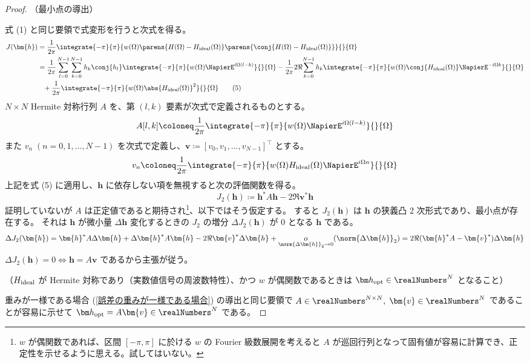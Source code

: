             \begin{proof}
                \quad\par\noindent
                （最小点の導出）
                \par
                式 (1) と同じ要領で式変形を行うと次式を得る。
                \begin{align*}
                    J(\bm{h}) &= \frac{1}{2\pi}\integrate{-\pi}{\pi}{w(\Omega)\parens{H(\Omega)-\Hideal(\Omega)}\parens{\conj{H(\Omega)-\Hideal(\Omega)}}}{}{\Omega} \\
                    &= \frac{1}{2\pi}\sum_{l=0}^{N-1}\sum_{k=0}^{N-1}h_k\conj{h_l}\integrate{-\pi}{\pi}{w(\Omega)\NapierE^{i\Omega(l-k)}}{}{\Omega} - \frac{1}{2\pi}2\Re{\sum_{k=0}^{N-1}h_k\integrate{-\pi}{\pi}{w(\Omega)\conj{\Hideal(\Omega)}\NapierE^{-i\Omega k}}{}{\Omega}} \\
                    &\phantom{=} + \frac{1}{2\pi}\integrate{-\pi}{\pi}{w(\Omega)\abs{\Hideal(\Omega)}^2}{}{\Omega}\tag{5}
                \end{align*}
                $N\times N$ Hermite 対称行列 $A$ を、第 $(l,k)$ 要素が次式で定義されるものとする。
                \[ A[l,k] \coloneq \frac{1}{2\pi}\integrate{-\pi}{\pi}{w(\Omega)\NapierE^{i\Omega(l-k)}}{}{\Omega} \]
                また $v_n\;(n=0,1,\dots,N-1)$ を次式で定義し、$\bm{v}\coloneq[v_0,v_1,\dots,v_{N-1}]^\top$ とする。
                \[ v_n \coloneq \frac{1}{2\pi}\integrate{-\pi}{\pi}{w(\Omega)\Hideal(\Omega)\NapierE^{i\Omega n}}{}{\Omega} \]
                上記を式 (5) に適用し、$\bm{h}$ に依存しない項を無視すると次の評価関数を得る。
                \[ J_2(\bm{h}) \coloneq \bm{h}^*A\bm{h} - 2\Re{\bm{v}^*\bm{h}} \]
                証明していないが $A$ は正定値であると期待され\footnote{$w$ が偶関数であれば、区間 $[-\pi,\pi]$ に於ける $w$ の Fourier 級数展開を考えると $A$ が巡回行列となって固有値が容易に計算でき、正定性を示せるように思える。試してはいない。}、以下ではそう仮定する。
                すると $J_2(\bm{h})$ は $\bm{h}$ の狭義凸 2 次形式であり、最小点が存在する。
                それは $\bm{h}$ が微小量 $\Delta\bm{h}$ 変化するときの $J_2$ の増分 $\Delta J_2(\bm{h})$ が 0 となる $\bm{h}$ である。
                \[ \Delta J_2(\bm{h}) = \bm{h}^*A\Delta\bm{h} + \Delta\bm{h}^*A\bm{h} - 2\Re{\bm{v}^*\Delta\bm{h}} + \underset{\norm{\Delta\bm{h}}_2\to 0}{o}(\norm{\Delta\bm{h}}_2) = 2\Re{(\bm{h}^*A-\bm{v}^*)\Delta\bm{h}} \]
                $\Delta J_2(\bm{h}) = 0\iff\bm{h} = A\bm{v}$ であるから主張が従う。
                \newline
                \par\noindent
                （$H_\text{ideal}$ が Hermite 対称であり（実数値信号の周波数特性）、かつ $w$ が偶関数であるときは $\vhOpt\in\realNumbers^N$ となること）
                \par
                重みが一様である場合 (\cref{誤差の重みが一様である場合}) の導出と同じ要領で $A\in\realNumbers^{N\times N},\;\bm{v}\in\realNumbers^N$ であることが容易に示せて $\vhOpt=A\bm{v}\in\realNumbers^N$ である。
            \end{proof}
